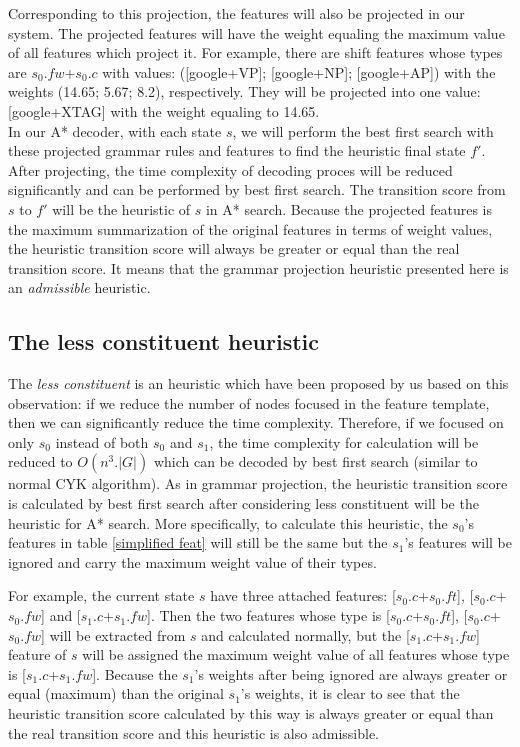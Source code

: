 Corresponding to this projection, the features will also be projected in our system. The projected features will have the weight equaling the maximum value of all features which project it. For example, there are shift features whose types are $s_0.fw$+$s_0.c$ with values: ([google+VP]; [google+NP]; [google+AP]) with the weights (14.65; 5.67; 8.2), respectively. They will be projected into one value: [google+XTAG] with the weight equaling to 14.65.\\
\indent In our A* decoder, with each state $s$, we will perform the best first search with these projected grammar rules and features to find the heuristic final state $f'$. After projecting, the time complexity of decoding proces will be reduced significantly and can be performed by best first search. The transition score from $s$ to $f'$ will be the heuristic of $s$ in A* search. Because the projected features is the maximum summarization of the original features in terms of weight values, the heuristic transition score will always be greater or equal than the real transition score. It means that the grammar projection heuristic presented here is an \textit{admissible} heuristic.

\subsection{The less constituent heuristic}
The \textit{less constituent} is an heuristic which have been proposed by us based on this observation: if we reduce the number of nodes focused in the feature template, then we can significantly reduce the time complexity. Therefore, if we focused on only $s_0$ instead of both $s_0$ and $s_1$, the time complexity for calculation will be reduced to $O(n^3.|G|)$ which can be decoded by best first search (similar to normal CYK algorithm). As in grammar projection, the heuristic transition score is calculated by best first search after considering less constituent will be the heuristic for A* search. More specifically, to calculate this heuristic, the $s_0$'s features in table \ref{simplified feat} will still be the same but the $s_1$'s features will be ignored and carry the maximum weight value of their types.


For example, the current state $s$ have three attached features: [$s_0.c$+$s_0.ft$], [$s_0.c$+$s_0.fw$] and [$s_1.c$+$s_1.fw$]. Then the two features whose type is [$s_0.c$+$s_0.ft$], [$s_0.c$+$s_0.fw$] will be extracted from $s$ and calculated normally, but the [$s_1.c$+$s_1.fw$] feature of $s$ will be assigned the maximum weight value of all features whose type is [$s_1.c$+$s_1.fw$]. Because the $s_1$'s weights after being ignored are always greater or equal (maximum) than the original $s_1$'s weights, it is clear to see that the heuristic transition score calculated by this way is always greater or equal than the real transition score and this heuristic is also admissible.

